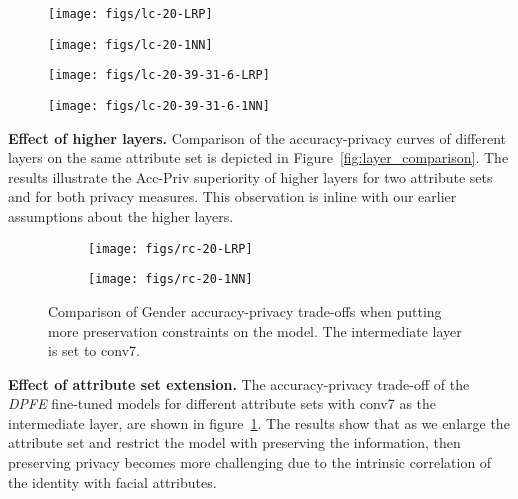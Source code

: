 \documentclass[10pt,journal,compsoc]{IEEEtran}
\begin{document}
\begin{figure*}[!ht] 
	\centering
	\begin{subfigure}[t]{0.25\textwidth}
		\centering
		\texttt{[image: figs/lc-20-LRP]}
	\end{subfigure}%
	\begin{subfigure}[t]{0.25\textwidth}
		\centering
		\texttt{[image: figs/lc-20-1NN]}
	\end{subfigure}%
	\begin{subfigure}[t]{0.25\textwidth}
		\centering
		\texttt{[image: figs/lc-20-39-31-6-LRP]}
	\end{subfigure}%
	\begin{subfigure}[t]{0.25\textwidth}
		\centering
		\texttt{[image: figs/lc-20-39-31-6-1NN]}
	\end{subfigure}
	\caption{Layer Comparison: in general, higher layers achieve Acc-Priv superiority to lower layers. In this figure, all models are fine-tuned with the \emph{DPFE} architecture.}
	\label{fig:layer_comparison}
\end{figure*}\textbf{Effect of higher layers.} Comparison of the accuracy-privacy curves of different layers on the same attribute set is depicted in Figure~\ref{fig:layer_comparison}. The results illustrate the Acc-Priv superiority of higher layers for two attribute sets and for both privacy measures. This observation is inline with our earlier assumptions about the higher layers.\\

\begin{figure}[t]
	\centering
	\begin{subfigure}[t]{0.5\columnwidth}
		\centering
		\texttt{[image: figs/rc-20-LRP]}
	\end{subfigure}%
	\begin{subfigure}[t]{0.5\columnwidth}
		\centering
		\texttt{[image: figs/rc-20-1NN]}
	\end{subfigure}
	\caption{Comparison of Gender accuracy-privacy trade-offs when putting more preservation constraints on the model. The intermediate layer is set to conv7. }
	\label{fig:specificity}
\end{figure}\textbf{Effect of attribute set extension.} The accuracy-privacy trade-off of the \emph{DPFE} fine-tuned models for different attribute sets with conv7 as the intermediate layer, are shown in figure~\ref{fig:specificity}. The results show that as we enlarge the attribute set and restrict the model with preserving the information, then preserving privacy becomes more challenging due to the intrinsic correlation of the identity with facial attributes.\\ 
\end{document}
